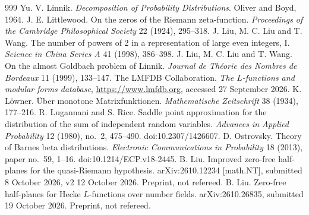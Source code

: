 \begin{thebibliography}{999}
 Yu. V. Linnik. \emph{Decomposition of Probability Distributions}. Oliver and Boyd, 1964.
 J. E. Littlewood. On the zeros of the Riemann zeta-function. \emph{Proceedings of the Cambridge Philosophical Society} 22 (1924), 295--318.
 J. Liu, M. C. Liu and T. Wang. The number of powers of 2 in a representation of large even integers, I. \emph{Science in China Series A} 41 (1998), 386--398.
 J. Liu, M. C. Liu and T. Wang. On the almost Goldbach problem of Linnik. \emph{Journal de Th\'eorie des Nombres de Bordeaux} 11 (1999), 133--147.
 The LMFDB Collaboration. \emph{The $L$-functions and modular forms database}, \url{https://www.lmfdb.org}, accessed 27 September 2026.
 K. L\"owner. \"Uber monotone Matrixfunktionen. \emph{Mathematische Zeitschrift} 38 (1934), 177--216.
 R. Lugannani and S. Rice. Saddle point approximation for the distribution of the sum of independent random variables. \emph{Advances in Applied Probability} 12 (1980), no.~2, 475--490. doi:10.2307/1426607. %
 D. Ostrovsky. Theory of Barnes beta distributions. \emph{Electronic Communications in Probability} 18 (2013), paper no.~59, 1--16. doi:10.1214/ECP.v18-2445. %
 B. Liu. Improved zero-free half-planes for the quasi-Riemann hypothesis. arXiv:2610.12234 [math.NT], submitted 8 October 2026, v2 12 October 2026. Preprint, not refereed. %
 B. Liu. Zero-free half-planes for Hecke $L$-functions over number fields. arXiv:2610.26835, submitted 19 October 2026. Preprint, not refereed. %

\end{thebibliography}
